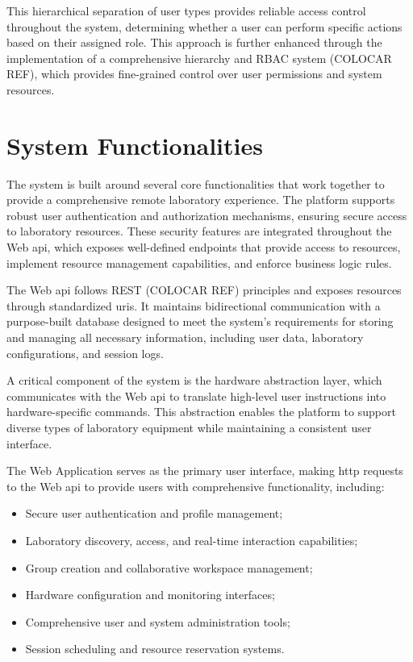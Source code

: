 This hierarchical separation of user types provides reliable access control throughout the system, determining whether a user can perform specific actions based on their assigned role. This approach is further enhanced through the implementation of a comprehensive hierarchy and RBAC system (COLOCAR REF), which provides fine-grained control over user permissions and system resources.

\section{System Functionalities}\label{sec:system_functionalities}
The system is built around several core functionalities that work together to provide a comprehensive remote laboratory experience. The platform supports robust user authentication and authorization mechanisms, ensuring secure access to laboratory resources. These security features are integrated throughout the Web \acs{api}, which exposes well-defined endpoints that provide access to resources, implement resource management capabilities, and enforce business logic rules.

The Web \acs{api} follows REST (COLOCAR REF) principles and exposes resources through standardized \acp{uri}. It maintains bidirectional communication with a purpose-built database designed to meet the system's requirements for storing and managing all necessary information, including user data, laboratory configurations, and session logs.

A critical component of the system is the hardware abstraction layer, which communicates with the Web \acs{api} to translate high-level user instructions into hardware-specific commands. This abstraction enables the platform to support diverse types of laboratory equipment while maintaining a consistent user interface.

The Web Application serves as the primary user interface, making \acs{http} requests to the Web \acs{api} to provide users with comprehensive functionality, including:

\begin{itemize}
    \item Secure user authentication and profile management;
    \item Laboratory discovery, access, and real-time interaction capabilities;
    \item Group creation and collaborative workspace management;
    \item Hardware configuration and monitoring interfaces;
    \item Comprehensive user and system administration tools;
    \item Session scheduling and resource reservation systems.
\end{itemize}

